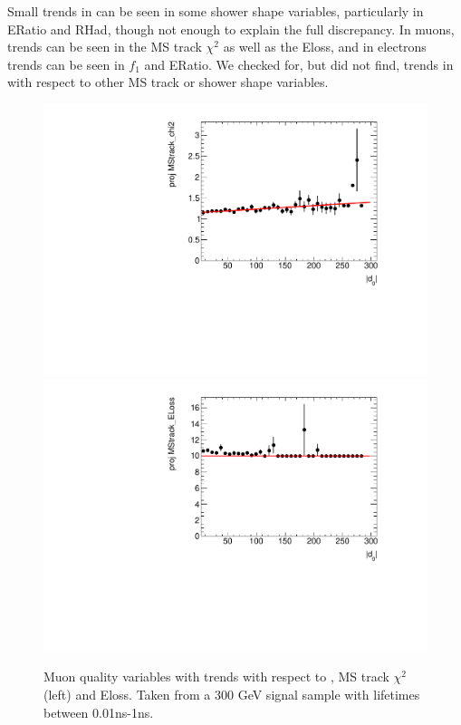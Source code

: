 


Small trends in \dz can be seen in some shower shape variables, particularly in ERatio and RHad, though not enough to explain the full discrepancy. In muons, trends can be seen in the \ac{MS} track $\chi^{2}$ as well as the Eloss, and in electrons trends can be seen in $f_{1}$ and ERatio. We checked for, but did not find, trends in \dz with respect to other \ac{MS} track or shower shape variables. 


\begin{figure}[htbp]
\centering
\includegraphics[width=.48\textwidth]{figures/disp_systs/m_signal_MStrack_chi2_profile.pdf}
\includegraphics[width=.48\textwidth]{figures/disp_systs/m_signal_MStrack_ELoss_profile.pdf}
\caption{Muon quality variables with trends with respect to \absdz, \ac{MS} track $\chi^{2}$ (left) and Eloss. Taken from a 300 GeV signal sample with lifetimes between 0.01ns-1ns.}
\label{fig:profs_mu}
\end{figure}

